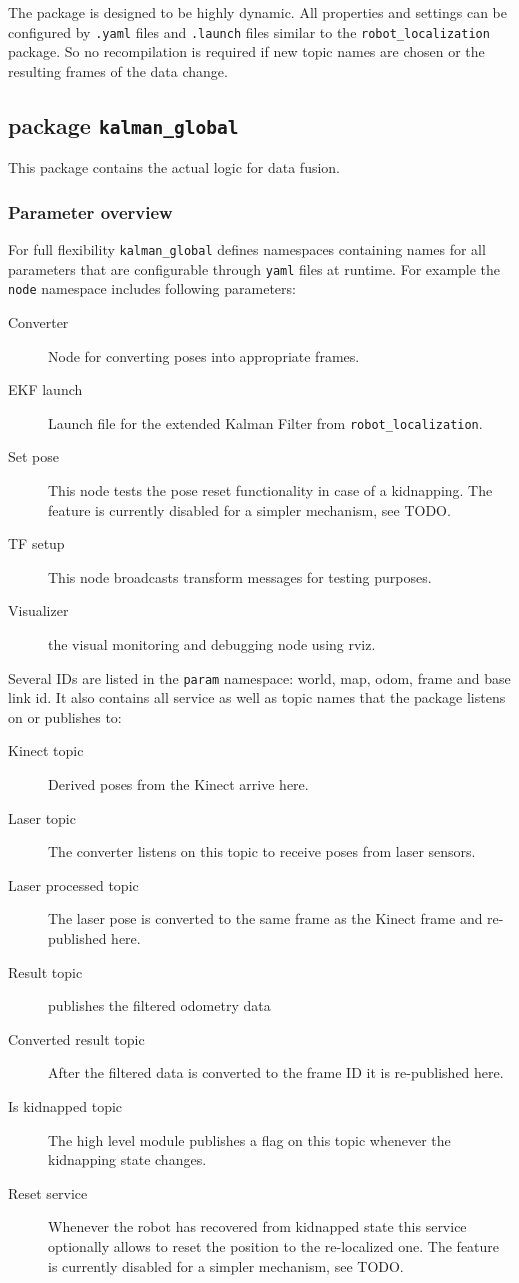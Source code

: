 The package is designed to be highly dynamic. All properties and settings can be configured by \texttt{.yaml} files and \texttt{.launch} files similar to the \texttt{robot\_localization} package. So no recompilation is required if new topic names are chosen or the resulting frames of the data change.

\subsection{package \texttt{kalman\_global}}
This package contains the actual logic for data fusion.

\subsubsection{Parameter overview}
For full flexibility \texttt{kalman\_global} defines namespaces containing names for all parameters that are configurable through \texttt{yaml} files at runtime. For example the \texttt{node} namespace includes following parameters:
\begin{description}
\item[Converter] Node for converting poses into appropriate frames.
\item[EKF launch] Launch file for the extended Kalman Filter from \texttt{robot\_localization}.
\item[Set pose] This node tests the pose reset functionality in case of a kidnapping. The feature is currently disabled for a simpler mechanism, see TODO.
\item[TF setup] This node broadcasts transform messages for testing purposes.
\item[Visualizer] the visual monitoring and debugging node using rviz.
\end{description}

Several IDs are listed in the \texttt{param} namespace: world, map, odom, frame and base link id. It also contains all service as well as topic names that the package listens on or publishes to:

\begin{description}
\item[Kinect topic] Derived poses from the Kinect arrive here.
\item[Laser topic] The converter listens on this topic to receive poses from laser sensors. 
\item[Laser processed topic] The laser pose is converted to the same frame as the Kinect frame and re-published here.
\item[Result topic] publishes the filtered odometry data
\item[Converted result topic] After the filtered data is converted to the frame ID it is re-published here.
\item[Is kidnapped topic] The high level module publishes a flag on this topic whenever the kidnapping state changes.
\item[Reset service] Whenever the robot has recovered from kidnapped state this service optionally allows to reset the position to the re-localized one. The feature is currently disabled for a simpler mechanism, see TODO.
\end{description}

